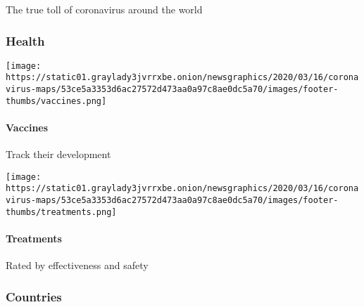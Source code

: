The true toll of coronavirus around the world

\hypertarget{health}{%
\subsubsection{Health}\label{health}}

\href{https://www.nytimes3xbfgragh.onion/interactive/2020/science/coronavirus-vaccine-tracker.html}{}

\texttt{[image: https://static01.graylady3jvrrxbe.onion/newsgraphics/2020/03/16/coronavirus-maps/53ce5a3353d6ac27572d473aa0a97c8ae0dc5a70/images/footer-thumbs/vaccines.png]}

\hypertarget{vaccines}{%
\paragraph{Vaccines}\label{vaccines}}

Track their development

\href{https://www.nytimes3xbfgragh.onion/interactive/2020/science/coronavirus-drugs-treatments.html}{}

\texttt{[image: https://static01.graylady3jvrrxbe.onion/newsgraphics/2020/03/16/coronavirus-maps/53ce5a3353d6ac27572d473aa0a97c8ae0dc5a70/images/footer-thumbs/treatments.png]}

\hypertarget{treatments}{%
\paragraph{Treatments}\label{treatments}}

Rated by effectiveness and safety

\hypertarget{countries}{%
\subsubsection{Countries}\label{countries}}

